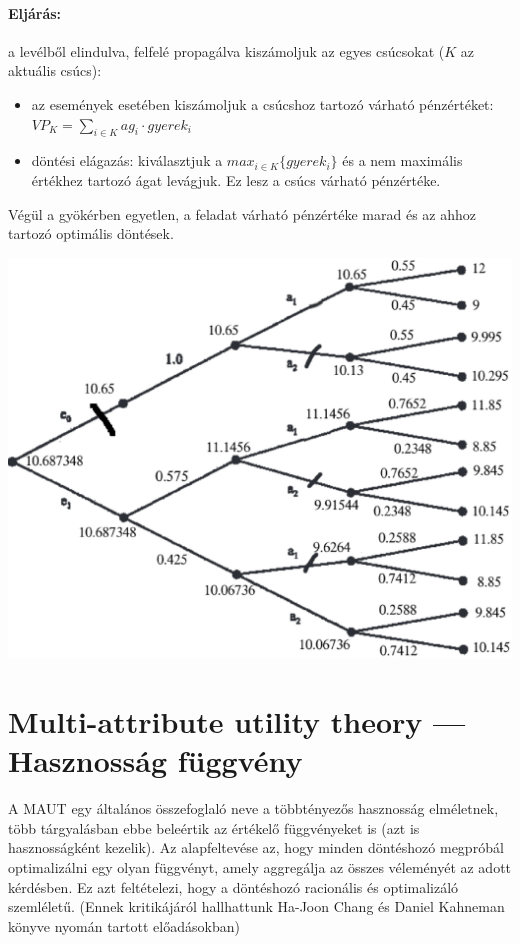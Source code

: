 \documentclass[a4paper,12pt]{article}
\begin{document}
\paragraph{Eljárás: }
a levélből elindulva, felfelé propagálva kiszámoljuk az egyes csúcsokat ($K$ az aktuális csúcs):
\begin{itemize}
\item az események esetében kiszámoljuk a csúcshoz tartozó várható pénzértéket: \\
 $VP_K = \sum_{i\in K} ag_i\cdot gyerek_i$ 
\item döntési elágazás: kiválasztjuk a $max_{i\in K}\{gyerek_i\}$ és a nem maximális értékhez tartozó ágat levágjuk. Ez lesz a csúcs várható pénzértéke.
\end{itemize}

Végül a gyökérben egyetlen, a feladat várható pénzértéke marad és az ahhoz tartozó optimális döntések.

\begin{center}

\includegraphics[scale=0.7]{dectree03}
\\
\end{center}

\section{Multi-attribute utility theory --- Hasznosság függvény}
\label{sec:utility}

A MAUT egy általános összefoglaló neve a többtényezős hasznosság elméletnek, több tárgyalásban ebbe beleértik az értékelő függvényeket is (azt is hasznosságként kezelik). Az alapfeltevése az, hogy minden döntéshozó megpróbál optimalizálni egy olyan függvényt, amely aggregálja az összes véleményét az adott kérdésben. Ez azt feltételezi, hogy a döntéshozó racionális és optimalizáló szemléletű. (Ennek kritikájáról hallhattunk Ha-Joon Chang és Daniel Kahneman könyve nyomán tartott előadásokban)
\end{document}
